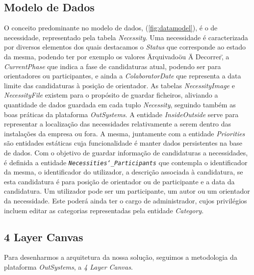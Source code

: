 \documentclass[a4paper,openright,11pt]{report}
\begin{document}
\subsection*{Modelo de Dados}\label{subsec:ModeloDados}
O conceito predominante no modelo de dados, (\ref{fig:datamodel}), é o de necessidade, representado pela tabela \textit{Necessity}. 
Uma necessidade é caracterizada por diversos elementos dos quais destacamos o \textit{Status} que corresponde ao estado da mesma, 
podendo ter por exemplo os valores \"Arquivado\" ou \"A Decorrer\", a \textit{CurrentPhase} que indica a fase de candidaturas atual, 
podendo ser para orientadores ou participantes, e ainda a \textit{ColaboratorDate} que representa a data limite das candidaturas 
à posição de orientador. 
As tabelas \textit{NecessityImage} e \textit{NecessityFile} existem para o propósito de guardar ficheiros, 
aliviando a quantidade de dados guardada em cada tuplo \textit{Necessity}, 
seguindo também as boas práticas da plataforma \textit{OutSystems}. 
A entidade \textit{InsideOutside} serve para representar a localização das necessidades relativamente a serem 
dentro das instalações da empresa ou fora. A mesma, juntamente com a entidade \textit{Priorities} 
são entidades estáticas cuja funcionalidade é manter dados persistentes na base de dados.
Com o objetivo de guardar informação de candidaturas a necessidades, é definida a entidade \texttt{\textit{Necessities\char`_Participants}} que 
contempla o identificador da mesma, o identificador do utilizador, a descrição associada à candidatura, 
se esta candidatura é para posição de orientador ou de participante e a data da candidatura. 
Um utilizador pode ser um participante, um autor ou um orientador da necessidade. 
Este poderá ainda ter o cargo de administrador, cujos privilégios incluem editar as categorias representadas pela 
entidade \textit{Category}.

\subsection*{4 Layer Canvas}\label{sec:4lc}

Para desenharmos a arquitetura da nossa solução, seguimos a metodologia da plataforma \textit{OutSystems}, a \textit{4 Layer Canvas}.
\end{document}
